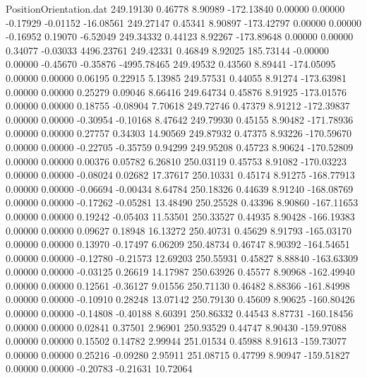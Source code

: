 \begin{filecontents}{PositionOrientation.dat}
 249.19130    0.46778    8.90989  -172.13840    0.00000    0.00000   -0.17929   -0.01152  -16.08561
 249.27147    0.45341    8.90897  -173.42797    0.00000    0.00000   -0.16952    0.19070   -6.52049
 249.34332    0.44123    8.92267  -173.89648    0.00000    0.00000    0.34077   -0.03033 4496.23761
 249.42331    0.46849    8.92025   185.73144   -0.00000    0.00000   -0.45670   -0.35876 -4995.78465
 249.49532    0.43560    8.89441  -174.05095    0.00000    0.00000    0.06195    0.22915    5.13985
 249.57531    0.44055    8.91274  -173.63981    0.00000    0.00000    0.25279    0.09046    8.66416
 249.64734    0.45876    8.91925  -173.01576    0.00000    0.00000    0.18755   -0.08904    7.70618
 249.72746    0.47379    8.91212  -172.39837    0.00000    0.00000   -0.30954   -0.10168    8.47642
 249.79930    0.45155    8.90482  -171.78936    0.00000    0.00000    0.27757    0.34303   14.90569
 249.87932    0.47375    8.93226  -170.59670    0.00000    0.00000   -0.22705   -0.35759    0.94299
 249.95208    0.45723    8.90624  -170.52809    0.00000    0.00000    0.00376    0.05782    6.26810
 250.03119    0.45753    8.91082  -170.03223    0.00000    0.00000   -0.08024    0.02682   17.37617
 250.10331    0.45174    8.91275  -168.77913    0.00000    0.00000   -0.06694   -0.00434    8.64784
 250.18326    0.44639    8.91240  -168.08769    0.00000    0.00000   -0.17262   -0.05281   13.48490
 250.25528    0.43396    8.90860  -167.11653    0.00000    0.00000    0.19242   -0.05403   11.53501
 250.33527    0.44935    8.90428  -166.19383    0.00000    0.00000    0.09627    0.18948   16.13272
 250.40731    0.45629    8.91793  -165.03170    0.00000    0.00000    0.13970   -0.17497    6.06209
 250.48734    0.46747    8.90392  -164.54651    0.00000    0.00000   -0.12780   -0.21573   12.69203
 250.55931    0.45827    8.88840  -163.63309    0.00000    0.00000   -0.03125    0.26619   14.17987
 250.63926    0.45577    8.90968  -162.49940    0.00000    0.00000    0.12561   -0.36127    9.01556
 250.71130    0.46482    8.88366  -161.84998    0.00000    0.00000   -0.10910    0.28248   13.07142
 250.79130    0.45609    8.90625  -160.80426    0.00000    0.00000   -0.14808   -0.40188    8.60391
 250.86332    0.44543    8.87731  -160.18456    0.00000    0.00000    0.02841    0.37501    2.96901
 250.93529    0.44747    8.90430  -159.97088    0.00000    0.00000    0.15502    0.14782    2.99944
 251.01534    0.45988    8.91613  -159.73077    0.00000    0.00000    0.25216   -0.09280    2.95911
 251.08715    0.47799    8.90947  -159.51827    0.00000    0.00000   -0.20783   -0.21631   10.72064

\end{filecontents}
